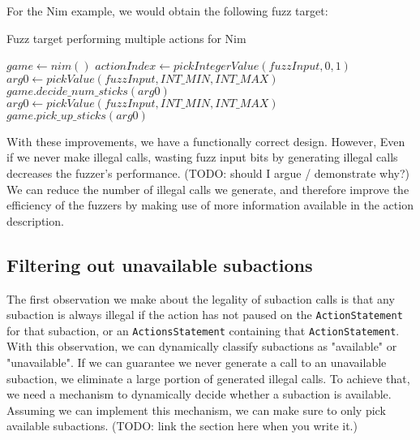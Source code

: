 For the Nim example, we would obtain the following fuzz target:
\begin{algorithm}[H]
    \caption{Fuzz target performing multiple actions for Nim}
    \begin{algorithmic}[1]
    \STATE $game \gets nim()$
        \STATE $actionIndex \gets pickIntegerValue(fuzzInput, 0, 1)$
            \STATE $arg0 \gets pickValue(fuzzInput, INT\_MIN, INT\_MAX)$
                \STATE $game.decide\_num\_sticks(arg0)$
            \ENDIF
        \ENDIF
            \STATE $arg0 \gets pickValue(fuzzInput, INT\_MIN, INT\_MAX)$
                \STATE $game.pick\_up\_sticks(arg0)$
            \ENDIF
        \ENDIF
    \ENDWHILE
    \end{algorithmic}
\end{algorithm}

With these improvements, we have a functionally correct design.
However, Even if we never make illegal calls, wasting fuzz input bits by generating illegal calls decreases the fuzzer's performance. (TODO: should I argue / demonstrate why?)
We can reduce the number of illegal calls we generate, and therefore improve the efficiency of the fuzzers by making use of more information available in the action description.

\subsection{Filtering out unavailable subactions}\label{filteringUnavailableSubactions}
The first observation we make about the legality of subaction calls is that any subaction is always illegal if the action has not paused on the \texttt{ActionStatement} for that subaction, or an \texttt{ActionsStatement} containing that \texttt{ActionStatement}.
With this observation, we can dynamically classify subactions as "available" or "unavailable".
If we can guarantee we never generate a call to an unavailable subaction, we eliminate a large portion of generated illegal calls.
To achieve that, we need a mechanism to dynamically decide whether a subaction is available.
Assuming we can implement this mechanism, we can make sure to only pick available subactions. (TODO: link the section here when you write it.)

